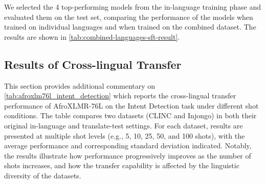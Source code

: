 We selected the 4 top-performing models from the in-language training phase and evaluated them on the \dataset{} test set, comparing the performance of the models when trained on individual languages and when trained on the combined dataset. The results are shown in \autoref{tab:combined-languages-sft-result}.


\subsection{Results of Cross-lingual Transfer}

This section provides additional commentary on \autoref{tab:afroxlm76l_intent_detection} which reports the cross-lingual transfer performance of AfroXLMR-76L on the Intent Detection task under different shot conditions. The table compares two datasets (CLINC and Injongo) in both their original in-language and translate-test settings. For each dataset, results are presented at multiple shot levels (e.g., 5, 10, 25, 50, and 100 shots), with the average performance and corresponding standard deviation indicated. Notably, the results illustrate how performance progressively improves as the number of shots increases, and how the transfer capability is affected by the linguistic diversity of the datasets.

